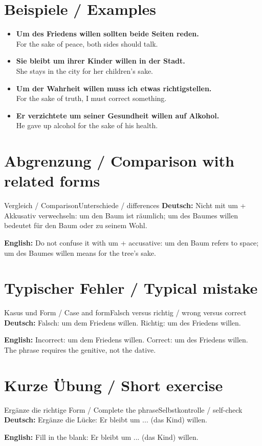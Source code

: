 \documentclass[a4paper,11pt]{article}
\newcommand{\GermanText}[1]{\textbf{Deutsch: }#1\par}
\newcommand{\EnglishText}[1]{{\small\color{SoftGray}\textbf{English: }#1\par}}
\newcommand{\ExampleItem}[2]{\item \textbf{#1}\\{\small\color{SoftGray}#2}}
\begin{document}
\section{Beispiele / Examples}
\begin{exbox}
\begin{itemize}
\ExampleItem{Um des Friedens willen sollten beide Seiten reden.}{For the sake of peace, both sides should talk.}
\ExampleItem{Sie bleibt um ihrer Kinder willen in der Stadt.}{She stays in the city for her children's sake.}
\ExampleItem{Um der Wahrheit willen muss ich etwas richtigstellen.}{For the sake of truth, I must correct something.}
\ExampleItem{Er verzichtete um seiner Gesundheit willen auf Alkohol.}{He gave up alcohol for the sake of his health.}
\end{itemize}
\end{exbox}
\section{Abgrenzung / Comparison with related forms}
\begin{grammarentry}{Vergleich / Comparison}{Unterschiede / differences}
\GermanText{Nicht mit um + Akkusativ verwechseln: um den Baum ist räumlich; um des Baumes willen bedeutet für den Baum oder zu seinem Wohl.}
\EnglishText{Do not confuse it with um + accusative: um den Baum refers to space; um des Baumes willen means for the tree's sake.}
\end{grammarentry}
\section{Typischer Fehler / Typical mistake}
\begin{grammarentry}{Kasus und Form / Case and form}{Falsch versus richtig / wrong versus correct}
\GermanText{Falsch: um dem Friedens willen. Richtig: um des Friedens willen.}
\EnglishText{Incorrect: um dem Friedens willen. Correct: um des Friedens willen. The phrase requires the genitive, not the dative.}
\end{grammarentry}
\section{Kurze Übung / Short exercise}
\begin{grammarentry}{Ergänze die richtige Form / Complete the phrase}{Selbstkontrolle / self-check}
\GermanText{Ergänze die Lücke: Er bleibt um ... (das Kind) willen.}
\EnglishText{Fill in the blank: Er bleibt um ... (das Kind) willen.}
\end{grammarentry}
\end{document}
